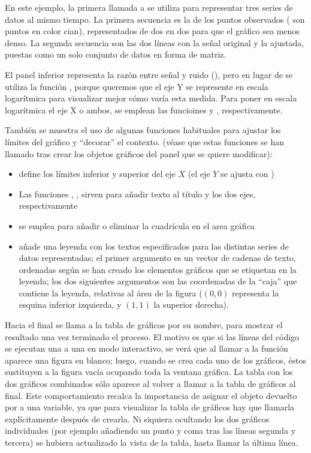 ﻿\documentclass[spanish]{article}
\begin{document}
En este ejemplo, la primera llamada a  se utiliza para representar
tres series de datos al mismo tiempo. La primera secuencia es la de los puntos observados
( son puntos en color cian), representados de dos en dos para que el
gráfico sea menos denso. La segunda secuencia son las dos líneas con la señal original y
la ajustada, puestas como un solo conjunto de datos en forma de matriz.

El panel inferior representa la razón entre señal y ruido (), pero
en lugar de  se utiliza la función , porque
queremos que el eje Y se represente en escala logarítmica para visualizar mejor
cómo varía esta medida. Para poner en escala logarítmica el eje X o ambos,
se emplean las funcioines  y , respectivamente.

También se muestra el uso de algunas funciones habituales para ajustar
los límites del gráfico y ``decorar'' el contexto.
(véase que estas funciones se han llamado tras crear los objetos gráficos del
panel que se quiere modificar):


\begin{itemize}
\item {} define los límites
inferior y superior del eje $X$ (el eje $Y$ se ajusta con )
\item Las funciones , , 
sirven para añadir texto al título y los dos ejes, respectivamente
\item {} se emplea para añadir o eliminar la cuadrícula en el area gráfica
\item {} añade una leyenda con los textos especificados para las
distintas series de datos representadas; el primer argumento es un vector
de cadenas de texto, ordenadas según se han creado los
elementos gráficos que se etiquetan en la leyenda; los dos siguientes argumentos
son las coordenadas de la ``caja'' que contiene la leyenda, relativas al
área de la figura ($(0,0)$ representa la esquina inferior izquierda, y
$(1,1)$ la superior derecha).
\end{itemize}

Hacia el final se llama a la tabla de gráficos por su nombre, para mostrar el resultado
una vez terminado el proceso. El motivo es que si las líneas del código se ejecutan
una a una en modo interactivo, se verá que al llamar a la función 
aparece una figura en blanco; luego, cuando se crea
cada uno de los gráficos, éstos
sustituyen a la figura vacía ocupando toda la ventana gráfica.
La tabla con los dos gráficos combinados sólo aparece
al volver a llamar a la tabla de gráficos al final.
Este comportamiento recalca la importancia de
asignar el objeto devuelto por  a una variable, ya que
para visualizar la tabla de gráficos hay que llamarla explícitamente
después de crearla. Ni siquiera ocultando los dos gráficos individuales
(por ejemplo añadiendo un punto y coma tras las líneas segunda y tercera)
se hubiera actualizado la vista de la tabla, hasta llamar la última línea.
\end{document}
